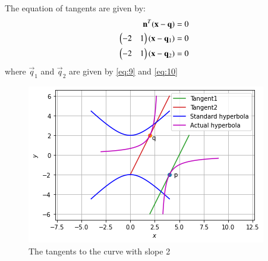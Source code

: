 \documentclass[journal,12pt,twocolumn]{IEEEtran}
\begin{document}
The equation of tangents are given by:
\begin{align}
    \mathbf{n}^T(\mathbf{x}-\mathbf{q})=0\\
    \begin{pmatrix}-2&1\end{pmatrix}(\mathbf{x}-\mathbf{q}_1)=0\\
    \begin{pmatrix}-2&1\end{pmatrix}(\mathbf{x}-\mathbf{q}_2)=0
\end{align}
where $\vec{q}_1$ and $\vec{q}_2$ are given by \eqref{eq:9} and \eqref{eq:10}
\begin{figure}[!ht]
\centering
\includegraphics[width=\columnwidth]{figure6}
\caption{The tangents to the curve with slope 2 }
\label{fig:tangents}	
\end{figure}
\end{document}
